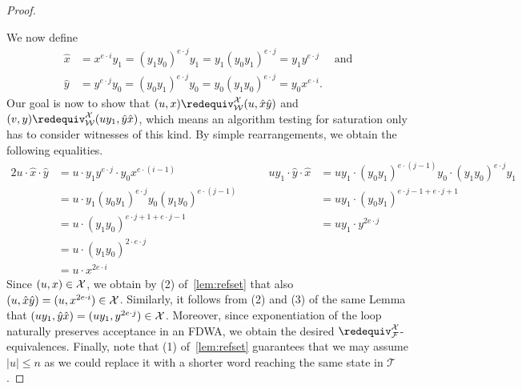 \documentclass[a4paper,USenglish,cleveref,autoref,thm-restate]{lipics-v2021}
\newcommand{\mc}[1]{\ensuremath{\mathcal{#1}}}
\newcommand{\T}{\mc{T}}
\newcommand{\F}{\mc{F}}
\newcommand{\W}{\mc{W}}
\begin{document}
{\begin{proof}
\begin{center}
  \end{center}
  We now define
  \begin{align*}
      \hat{x} &= x^{e\cdot i}y_1 = (y_1y_0)^{e\cdot j}y_1 = y_1(y_0y_1)^{e\cdot j} = y_1y^{e\cdot j} \quad \text{ and}\\
      \hat{y} &= y^{e\cdot j}y_0 = (y_0y_1)^{e\cdot j}y_0 = y_0(y_1y_0)^{e\cdot j} = y_0x^{e\cdot i}.
  \end{align*}
  Our goal is now to show that $(u,x)\redequiv^\X_\W (u,\hat{x}\hat{y})$ and $(v,y)\redequiv^\X_\W (uy_1,\hat{y}\hat{x})$, which means an algorithm testing for saturation only has to consider witnesses of this kind.
  By simple rearrangements, we obtain the following equalities.
  \begin{alignat*}{2}
          u\cdot \hat{x}\cdot\hat{y} &= u \cdot y_1y^{e\cdot j} \cdot y_0x^{e\cdot (i-1)} & 
          \qquad uy_1 \cdot\hat{y}\cdot\hat{x} &= uy_1\cdot (y_0y_1)^{e\cdot(j-1)} y_0\cdot (y_1y_0)^{e\cdot j}y_1\\
          &= u\cdot y_1(y_0y_1)^{e\cdot j} y_0(y_1y_0)^{e\cdot(j-1)} &&= uy_1\cdot (y_0y_1)^{e\cdot j - 1 + e \cdot j + 1}\\
          &= u\cdot (y_1y_0)^{e\cdot j + 1 + e \cdot j - 1} &&= uy_1\cdot y^{2e\cdot j}\\
          &= u\cdot (y_1y_0)^{2\cdot e \cdot j}\\
          &= u\cdot x^{2e\cdot i}
  \end{alignat*}
  Since $(u,x) \in \mathcal{X}$, we obtain by (2) of~\cref{lem:refset} that also $(u,\hat{x}\hat{y}) = (u,x^{2e\cdot i}) \in \mathcal{X}$.
  Similarly, it follows from (2) and (3) of the same Lemma that $(uy_1, \hat{y}\hat{x}) = (uy_1, y^{2e\cdot j}) \in \mathcal{X}$.
  Moreover, since exponentiation of the loop naturally preserves acceptance in an FDWA, we obtain the desired $\redequiv^\X_\F$-equivalences.
  Finally, note that (1) of~\cref{lem:refset} guarantees that we may assume $|u| \leq n$ as we could replace it with a shorter word reaching the same state in $\T$.
\end{proof}

}
\end{document}
